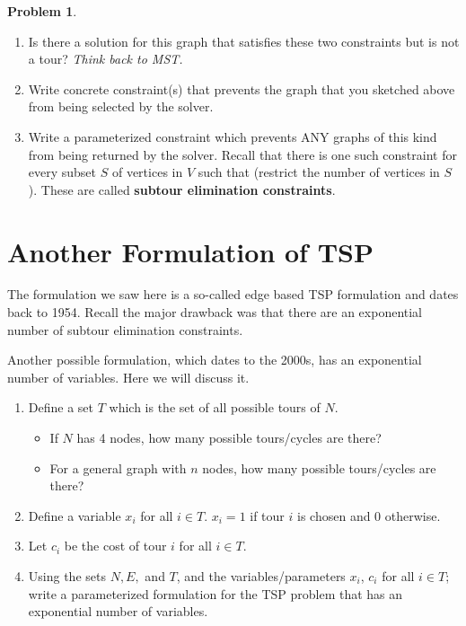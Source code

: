 \documentclass[11pt]{article}
\theoremstyle{definition}
\newtheorem{problem}{Problem}
\newcommand{\answerbox}[3]{%
  \fbox{%
    \begin{minipage}[#1]{#2}
      \hfill\vspace{#3}
    \end{minipage}
  }
}
\newcommand{\wordbox}{\answerbox{c}{1.2in}{.7cm}}
\begin{document}
\begin{problem}
\begin{enumerate}[resume]
\newpage
\item Is there a solution for this graph that satisfies these two constraints but is not a tour? \emph{Think back to MST.}

\vspace{2.5in}


\item Write concrete constraint(s) that prevents the graph that you sketched above from being selected by the solver.  \vspace{1.25in}



\item Write a parameterized constraint which prevents ANY graphs of this kind from being returned by the solver. Recall that there is one such constraint for every subset $S$ of vertices in $V$ such that \wordbox (restrict the number of vertices in $S$). These are called \textbf{subtour elimination constraints}.
\vfill
\newpage

\end{enumerate}

\end{problem}

\newpage

\section{Another Formulation of TSP}

The formulation we saw here is a so-called edge based TSP formulation and dates back to 1954. Recall the major drawback was that there are an exponential number of subtour elimination constraints.

Another possible formulation, which dates to the 2000s, has an exponential number of variables. Here we will discuss it.

\begin{enumerate}
\item Define a set $T$ which is the set of all possible tours of $N$.
	\begin{itemize}
	\item If $N$ has 4 nodes, how many possible tours/cycles are there? \vspace{2in}
	\item For a general graph with $n$ nodes, how many possible tours/cycles are there? \vspace{1in}
	\end{itemize}
\item Define a variable $x_i$ for all $i \in T$. $x_i = 1$ if tour $i$ is chosen and 0 otherwise. \vspace{1in}
\item Let $c_i$ be the cost of tour $i$ for all $i \in T$. \newpage
\item Using the sets $N, E,$ and $T$, and the variables/parameters $x_i$, $c_i$ for all $i \in T$; write a parameterized formulation for the TSP problem that has an exponential number of variables. \
\end{enumerate}
\end{document}
